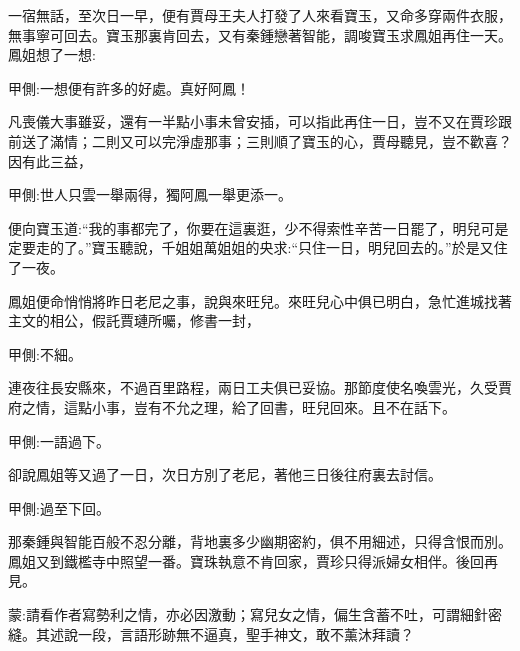 \begin{parag}
    一宿無話，至次日一早，便有賈母王夫人打發了人來看寶玉，又命多穿兩件衣服，無事寧可回去。寶玉那裏肯回去，又有秦鍾戀著智能，調唆寶玉求鳳姐再住一天。鳳姐想了一想:\begin{note}甲側:一想便有許多的好處。真好阿鳳！\end{note}凡喪儀大事雖妥，還有一半點小事未曾安插，可以指此再住一日，豈不又在賈珍跟前送了滿情；二則又可以完淨虛那事；三則順了寶玉的心，賈母聽見，豈不歡喜？因有此三益，\begin{note}甲側:世人只雲一舉兩得，獨阿鳳一舉更添一。\end{note}便向寶玉道:“我的事都完了，你要在這裏逛，少不得索性辛苦一日罷了，明兒可是定要走的了。”寶玉聽說，千姐姐萬姐姐的央求:“只住一日，明兒回去的。”於是又住了一夜。
\end{parag}


\begin{parag}
    鳳姐便命悄悄將昨日老尼之事，說與來旺兒。來旺兒心中俱已明白，急忙進城找著主文的相公，假託賈璉所囑，修書一封，\begin{note}甲側:不細。\end{note}連夜往長安縣來，不過百里路程，兩日工夫俱已妥協。那節度使名喚雲光，久受賈府之情，這點小事，豈有不允之理，給了回書，旺兒回來。且不在話下。\begin{note}甲側:一語過下。\end{note}
\end{parag}


\begin{parag}
    卻說鳳姐等又過了一日，次日方別了老尼，著他三日後往府裏去討信。\begin{note}甲側:過至下回。\end{note}那秦鍾與智能百般不忍分離，背地裏多少幽期密約，俱不用細述，只得含恨而別。鳳姐又到鐵檻寺中照望一番。寶珠執意不肯回家，賈珍只得派婦女相伴。後回再見。
\end{parag}


\begin{parag}
    \begin{note}蒙:請看作者寫勢利之情，亦必因激動；寫兒女之情，偏生含蓄不吐，可謂細針密縫。其述說一段，言語形跡無不逼真，聖手神文，敢不薰沐拜讀？\end{note}
\end{parag}
